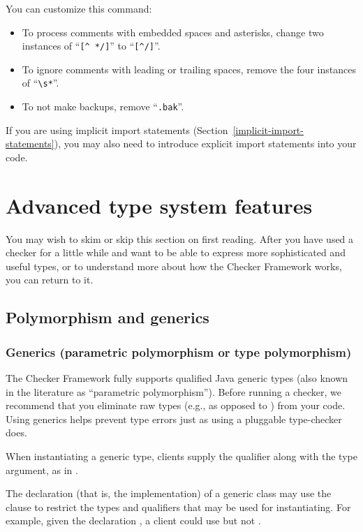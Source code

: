 You can customize this command:
\begin{itemize}
\item
To process comments with embedded spaces and asterisks, change 
two instances of ``\verb|[^ */]|'' to ``\verb|[^/]|''.
\item
To ignore comments with leading or trailing spaces, remove the four
instances of ``\verb|\s*|''.  
\item
  To not make backups, remove
``\verb|.bak|''.
\end{itemize}


If you are using implicit import statements
(Section~\ref{implicit-import-statements}), you may also need to introduce
explicit import statements into your code.


\section{Advanced type system features\label{advanced-type-system-features}}

You may wish to skim or skip this section on first reading.  After you have
used a checker for a little while and want to be able to express more
sophisticated and useful types, or to understand more about how the Checker
Framework works, you can return to it.


\subsection{Polymorphism and generics\label{polymorphism}}

\subsubsection{Generics (parametric polymorphism or type polymorphism)\label{generics}}

The Checker Framework fully supports 
qualified Java generic types (also known in the literature as ``parametric
polymorphism'').  Before running a checker, we recommend that you eliminate
raw types (e.g.,  as opposed to ) from your code.
Using generics helps prevent type errors just as using a pluggable
type-checker does.

When instantiating a generic type, 
clients supply the qualifier along with the type argument, as in
.

The declaration (that is, the implementation) of a generic class may use
the  clause to restrict the types and qualifiers that may be
used for instantiating.  For example, given the declaration , a client could use
 but not .

